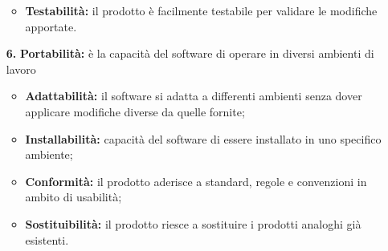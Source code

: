 \begin{itemize}
\begin{itemize}
		\item \textbf{Testabilità:} il prodotto è facilmente testabile per validare le modifiche apportate.
	\end{itemize}
	\item[\textbf{6.}]\textbf{Portabilità:} è la capacità del software di operare in diversi ambienti di lavoro
	\begin{itemize}
		\item \textbf{Adattabilità:} il software si adatta a differenti ambienti senza dover applicare modifiche diverse da quelle fornite;
		\item \textbf{Installabilità:} capacità del software di essere installato in uno specifico ambiente;
		\item \textbf{Conformità:} il prodotto aderisce a standard, regole e convenzioni in ambito di usabilità;
		\item \textbf{Sostituibilità:} il prodotto riesce a sostituire i prodotti analoghi già esistenti.
	\end{itemize}
\end{itemize}